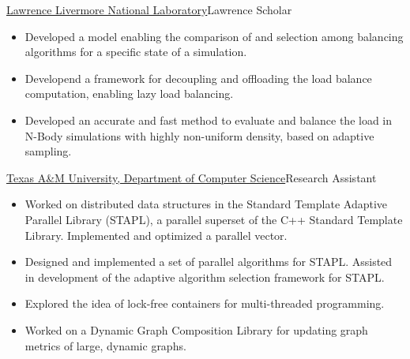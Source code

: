 		{\href{http://www.llnl.gov}{Lawrence Livermore National Laboratory}}{Lawrence Scholar}{}{}
		{\begin{itemize}
            \item Developed a model enabling the comparison of and selection among
                  balancing algorithms for a specific state of a simulation.
            \item Developend a framework for decoupling and offloading the load balance computation,
                  enabling lazy load balancing.
            \item Developed an accurate and fast method to evaluate and balance the load in N-Body simulations
                  with highly non-uniform density, based on adaptive sampling.
		\end{itemize}}

		{\href{http://www.cse.tamu.edu/}{Texas A\&M University, Department of Computer Science}}{Research Assistant}{}{}
		{\begin{itemize}
			\item Worked on distributed data structures in the Standard Template Adaptive Parallel Library (STAPL),
				a parallel superset of the C++ Standard Template Library. Implemented and optimized a parallel vector.
			\item Designed and implemented a set of parallel algorithms for STAPL.
				Assisted in development of the adaptive algorithm selection framework for STAPL.
			\item Explored the idea of lock-free containers for multi-threaded programming.
			\item Worked on a Dynamic Graph Composition Library for updating graph metrics of large, dynamic graphs.
		\end{itemize}}

